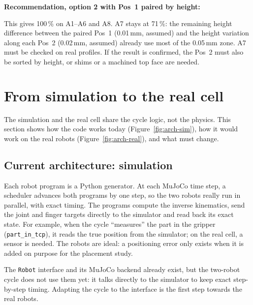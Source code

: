 \documentclass[11pt,a4paper]{article}
\newcommand{\code}[1]{\texttt{#1}}
\begin{document}
\textbf{Recommendation, option 2 with Pos~1 paired by height:}

This gives 100\,\% on A1--A6 and A8. A7 stays at 71\,\%: the remaining height difference between
the paired Pos~1 (0.01\,mm, assumed) and the height variation along each Pos~2 (0.02\,mm, assumed)
already use most of the 0.05\,mm zone. A7 must be checked on real profiles. If the result is
confirmed, the Pos~2 must also be sorted by height, or shims or a machined top face are needed.

\section{From simulation to the real cell}
\label{sec:sim2real}

The simulation and the real cell share the cycle logic, not the physics. This section shows how the
code works today (Figure~\ref{fig:arch-sim}), how it would work on the real robots
(Figure~\ref{fig:arch-real}), and what must change.

\subsection{Current architecture: simulation}

Each robot program is a Python generator. At each MuJoCo time step, a scheduler advances both
programs by one step, so the two robots really run in parallel, with exact timing. The programs
compute the inverse kinematics, send the joint and finger targets directly to the simulator and read
back its exact state. For example, when the cycle ``measures'' the part in the gripper
(\code{part\_in\_tcp}), it reads the true position from the simulator; on the real cell, a sensor
is needed. The robots are ideal: a positioning error only exists when it is added on purpose for the
placement study.

The \code{Robot} interface and its MuJoCo backend already exist, but the two-robot cycle does not
use them yet: it talks directly to the simulator to keep exact step-by-step timing. Adapting the
cycle to the interface is the first step towards the real robots.
\end{document}
